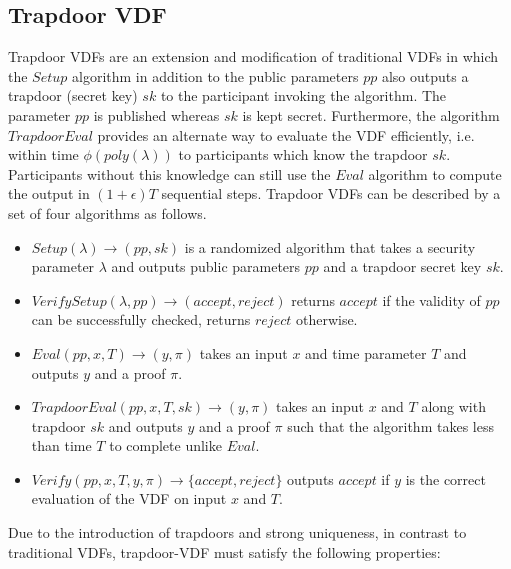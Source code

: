 \documentclass[letterpaper,twocolumn,10pt]{article}
\theoremstyle{definition}
\theoremstyle{remark}
\begin{document}
\subsection{Trapdoor VDF}
\label{appendix:tvdf}
Trapdoor VDFs \cite{wesolowski2019efficient, schindler2021randrunner} are an extension and modification of traditional VDFs in which the $Setup$ algorithm in addition to the public parameters $pp$ also outputs a trapdoor (secret key) $sk$ to the participant invoking the algorithm.  The parameter $pp$ is published whereas $sk$ is kept secret. Furthermore, the algorithm $TrapdoorEval$ provides an alternate way to evaluate the VDF efficiently, i.e. within time $\phi{(poly{(\lambda)})}$ to participants which know the trapdoor $sk$. Participants without this knowledge can still use the $Eval$ algorithm to compute the output in $(1+\epsilon)T$ sequential steps.
Trapdoor VDFs can be described by a set of four algorithms as follows.
\begin{itemize}
    \item $Setup(\lambda) \rightarrow (pp, sk)$ is a randomized algorithm that takes a security parameter $\lambda$ and outputs public parameters $pp$ and a trapdoor secret key $sk$.
    \item $VerifySetup(\lambda, pp) \rightarrow (accept, reject)$ returns $accept$ if the validity of $pp$ can be successfully checked, returns $reject$ otherwise.
    \item $Eval(pp, x, T) \rightarrow (y, \pi)$ takes an input $x$ and time parameter $T$ and outputs $y$ and a proof $\pi$.
    \item $TrapdoorEval(pp,x,T,sk) \rightarrow (y, \pi)$ takes an input $x$ and $T$ along with trapdoor $sk$ and outputs $y$ and a proof $\pi$ such that the algorithm takes less than time $T$ to complete unlike $Eval$.
    \item $Verify(pp, x, T, y, \pi) \rightarrow \{accept, reject\}$ outputs $accept$ if $y$ is the correct evaluation of the VDF on input $x$ and $T$.
\end{itemize}

Due to the introduction of trapdoors and strong uniqueness, in contrast to traditional VDFs, trapdoor-VDF must satisfy the following properties:
\end{document}
